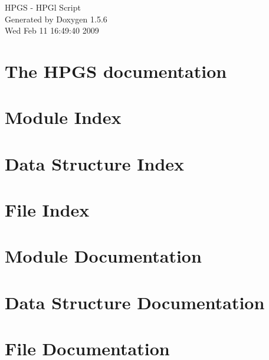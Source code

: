\documentclass[a4paper]{book}
\begin{document}
\begin{titlepage}
\vspace*{7cm}
\begin{center}
{\Large HPGS - HPGl Script }\\
\vspace*{1cm}
{\large Generated by Doxygen 1.5.6}\\
\vspace*{0.5cm}
{\small Wed Feb 11 16:49:40 2009}\\
\end{center}
\end{titlepage}
\clearemptydoublepage
{}
\tableofcontents
\clearemptydoublepage
{}
\chapter{The HPGS documentation}
\label{index}
\chapter{Module Index}

\chapter{Data Structure Index}

\chapter{File Index}

\chapter{Module Documentation}








\chapter{Data Structure Documentation}
































\chapter{File Documentation}




\printindex
\end{document}
